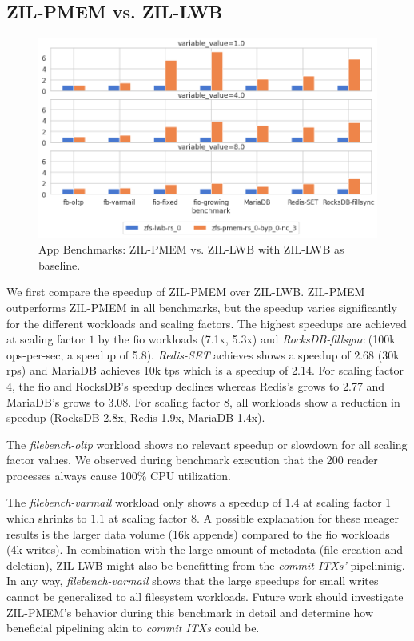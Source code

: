 \documentclass[12pt,a4paper,twoside]{book}
\begin{document}
\subsection{ZIL-PMEM vs. ZIL-LWB}\label{sec:eval:zilpmemvslwb}

\begin{figure}[H]
    \centering
    \includegraphics[width=\textwidth]{fig/evaluation/app_benchmarks__zilpmem_vs_zillwb}
    \caption{App Benchmarks: ZIL-PMEM vs. ZIL-LWB with ZIL-LWB as baseline.}
\end{figure}

We first compare the speedup of ZIL-PMEM over ZIL-LWB.
ZIL-PMEM outperforms ZIL-PMEM in all benchmarks, but the speedup varies significantly for the different workloads and scaling factors.
The highest speedups are achieved at scaling factor $1$ by the fio workloads (7.1x, 5.3x) and \textit{RocksDB-fillsync} (100k ops-per-sec, a speedup of 5.8).
\textit{Redis-SET} achieves shows a speedup of $2.68$ (30k rps) and MariaDB achieves 10k tps which is a speedup of 2.14.
For scaling factor $4$, the fio and RocksDB's speedup declines whereas Redis's grows to 2.77 and MariaDB's grows to 3.08.
For scaling factor $8$, all workloads show a reduction in speedup (RocksDB 2.8x, Redis 1.9x, MariaDB 1.4x).

The \textit{filebench-oltp} workload shows no relevant speedup or slowdown for all scaling factor values.
We observed during benchmark execution that the 200 reader processes always cause 100\% CPU utilization.

The \textit{filebench-varmail} workload only shows a speedup of $1.4$ at scaling factor 1 which shrinks to $1.1$ at scaling factor 8.
A possible explanation for these meager results is the larger data volume (16k appends) compared to the fio workloads (4k writes).
In combination with the large amount of metadata (file creation and deletion), ZIL-LWB might also be benefitting from the \textit{commit ITXs'} pipelininig.
In any way, \textit{filebench-varmail} shows that the large speedups for small writes cannot be generalized to all filesystem workloads.
Future work should investigate ZIL-PMEM's behavior during this benchmark in detail and determine how beneficial pipelining akin to \textit{commit ITXs} could be.
\end{document}
